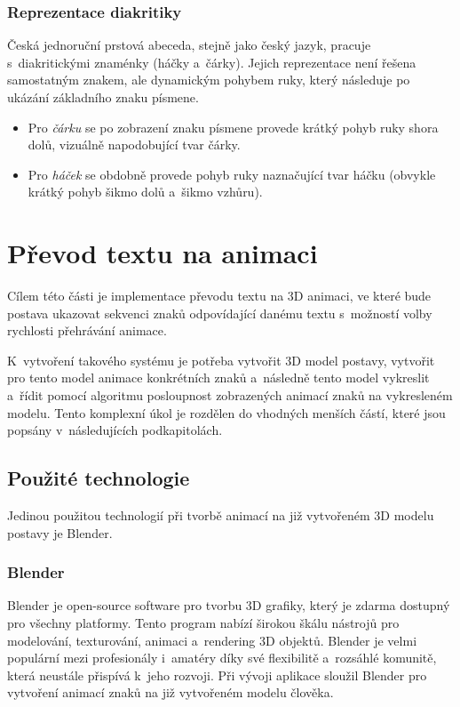 \documentclass[
  master,
  program=ainfvs,
  biblatex,
  figures=true,
  tables=false,
  sourcecodes=true,
  glossaries,
  index
]{kidiplom}
\begin{document}
        \subsubsection{Reprezentace diakritiky}
        
            Česká jednoruční prstová abeceda, stejně jako český jazyk, pracuje s~diakritickými znaménky (háčky a~čárky). Jejich reprezentace není řešena samostatným znakem, ale dynamickým pohybem ruky, který následuje po ukázání základního znaku písmene.
        
            \begin{itemize}
                \item Pro \emph{čárku} se po zobrazení znaku písmene provede krátký pohyb ruky shora dolů, vizuálně napodobující tvar čárky.
                \item Pro \emph{háček} se obdobně provede pohyb ruky naznačující tvar háčku (obvykle krátký pohyb šikmo dolů a~šikmo vzhůru).
            \end{itemize}
    
\clearpage



\section{Převod textu na animaci}
    Cílem této části je implementace převodu textu na 3D animaci, ve které bude postava ukazovat sekvenci znaků odpovídající danému textu s~možností volby rychlosti přehrávání animace.
    
    K~vytvoření takového systému je potřeba vytvořit 3D model postavy, vytvořit pro tento model animace konkrétních znaků a~následně tento model vykreslit a~řídit pomocí algoritmu posloupnost zobrazených animací znaků na vykresleném modelu. 
    Tento komplexní úkol je rozdělen do vhodných menších částí, které jsou popsány v~následujících podkapitolách.
    
    \subsection{Použité technologie}
        Jedinou použitou technologií při tvorbě animací na již vytvořeném 3D modelu postavy je Blender.
        
        \subsubsection{Blender}
            Blender je open-source software pro tvorbu 3D grafiky, který je zdarma dostupný pro všechny platformy. Tento program nabízí širokou škálu nástrojů pro modelování, texturování, animaci a~rendering 3D objektů. Blender je velmi populární mezi profesionály i~amatéry díky své flexibilitě a~rozsáhlé komunitě, která neustále přispívá k~jeho rozvoji. 
            Při vývoji aplikace sloužil Blender pro vytvoření animací znaků na již vytvořeném modelu člověka. \cite{blender}
\end{document}
